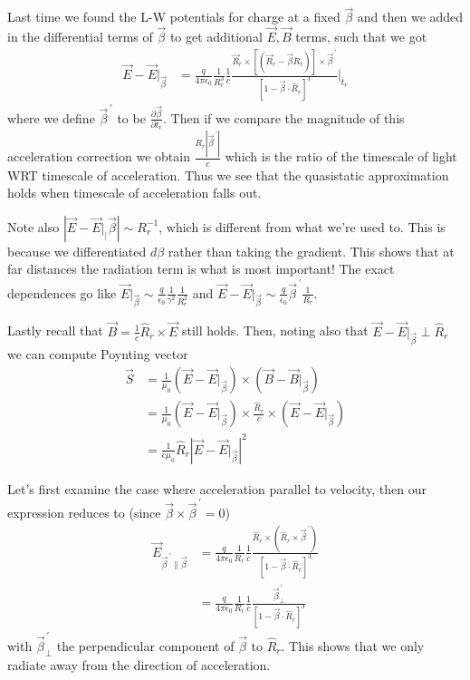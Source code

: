 \documentclass[10pt]{report}
\newcommand{\pd}[2]{\frac{\partial #1}{\partial#2}}
\newcommand{\pvec}[1]{\vec{#1}^{\,\prime}}
\newcommand{\abs}[1]{\left|#1\right|}
\begin{document}
Last time we found the L-W potentials for charge at a fixed $\vec{\beta}$ and then we added in the differential terms of $\vec{\beta}$ to get additional $\vec{E}, \vec{B}$ terms, such that we got
\begin{align}
    \vec{E} - \vec{E}\Bigg|_{\vec{\beta}} &= \frac{q}{4\pi\epsilon_0}\frac{1}{R_r^3}\frac{1}{c}\frac{\vec{R}_r \times \left[ \left( \vec{R}_r - \vec{\beta}R_r \right) \right] \times \pvec{\beta}}{\left[ 1 - \vec{\beta} \cdot \hat{R}_r \right]^3}\Bigg|_{t_r}
\end{align}
where we define $\pvec{\beta}$ to be $\pd{\vec{\beta}}{t_r}$. Then if we compare the magnitude of this acceleration correction we obtain $\frac{R_r  \abs{\pvec{\beta}}}{c}$ which is the ratio of the timescale of light WRT timescale of acceleration. Thus we see that the quasistatic approximation holds when timescale of acceleration falls out. 

Note also $\abs{\vec{E} - \vec{E}\Big|_|\vec{\beta}} \sim R_r^{-1}$, which is different from what we're used to. This is because we differentiated $d\beta$ rather than taking the gradient. This shows that at far distances the radiation term is what is most important! The exact dependences go like $\vec{E}\Big|_{\vec{\beta}} \sim \frac{q}{\epsilon_0}\frac{1}{\gamma^2}\frac{1}{R_r^2}$ and $\vec{E} - \vec{E}\Big|_{\vec{\beta}} \sim \frac{q}{\epsilon_0}\pvec{\beta} \frac{1}{R_r}$.

Lastly recall that $\vec{B} = \frac{1}{c} \hat{R}_r \times \vec{E}$ still holds. Then, noting also that $\vec{E} - \vec{E}\Big|_{\vec{\beta}} \perp \hat{R}_r$ we can compute Poynting vector
\begin{align}
    \vec{S} &= \frac{1}{\mu_0}\left( \vec{E} - \vec{E}\Big|_{\vec{\beta}} \right) \times \left(\vec{B} - \vec{B}\Big|_{\vec{\beta}}\right)\\
    &= \frac{1}{\mu_0}\left( \vec{E} - \vec{E}\Big|_{\vec{\beta}} \right) \times \frac{\hat{R}_r}{c}\times\left(\vec{E} - \vec{E}\Big|_{\vec{\beta}}\right)\\
    &= \frac{1}{c\mu_0}\hat{R}_r \abs{\vec{E} - \vec{E}\Big|_{\vec{\beta}}}^2
\end{align}

Let's first examine the case where acceleration parallel to velocity, then our expression reduces to (since $\vec{\beta} \times \pvec{\beta} = 0$)
\begin{align}
    \vec{E}_{\pvec{\beta}\parallel\vec{\beta}} &= \frac{q}{4\pi\epsilon_0}\frac{1}{R_r}\frac{1}{c}\frac{\hat{R}_r \times \left( \hat{R}_r \times \pvec{\beta} \right)}{\left[ 1 - \vec{\beta} \cdot \hat{R}_r \right]^3}\\
    &= \frac{q}{4\pi\epsilon_0}\frac{1}{R_r}\frac{1}{c}\frac{\pvec{\beta}_{\perp}}{\left[ 1 - \vec{\beta} \cdot \hat{R}_r \right]^3}
\end{align}
with $\pvec{\beta}_{\perp}$ the perpendicular component of $\vec{\beta}$ to $\hat{R}_r$. This shows that we only radiate away from the direction of acceleration.
\end{document}
